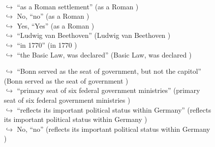 \documentclass[11pt,a4paper, onecolumn]{article}
\begin{document}
\begin{figure}[t]
\begin{tcolorbox}[boxsep=0pt,left=5pt,right=0pt,top=2pt,colback = yellow!5]
\begin{dialogue}
\\
\colorbox{pink!25}{$\hookrightarrow$}
{ ``as a Roman settlement'' (as a Roman ) }
\\
\colorbox{pink!25}{$\hookrightarrow$}
\colorbox{red!25}{No,}
{ ``no'' (as a Roman ) }
\\
\colorbox{pink!25}{$\hookrightarrow$}
\colorbox{red!25}{Yes,}
{ ``Yes'' (as a Roman ) }
\\
\colorbox{pink!25}{$\hookrightarrow$}
{ ``Ludwig van Beethoven'' (Ludwig van Beethoven ) }
\\
\colorbox{pink!25}{$\hookrightarrow$}
{ ``in 1770'' (in 1770 ) }
\\
\colorbox{pink!25}{$\hookrightarrow$}
{ ``the Basic Law, was declared'' (Basic Law, was declared ) }
 \end{dialogue}\end{tcolorbox}\end{figure}\begin{figure}[t] \small \begin{tcolorbox}[boxsep=0pt,left=5pt,right=0pt,top=2pt,colback = yellow!5] \begin{dialogue}
 \small 
\colorbox{pink!25}{$\hookrightarrow$}
{ ``Bonn served as the seat of government, but not the capitol'' (Bonn served as the seat of government ) }
\\
\colorbox{pink!25}{$\hookrightarrow$}
{ ``primary seat of six federal government ministries'' (primary seat of six federal government ministries ) }
\\
\colorbox{pink!25}{$\hookrightarrow$}
{ ``reflects its important political status within Germany'' (reflects its important political status within Germany ) }
\\
\colorbox{pink!25}{$\hookrightarrow$}
\colorbox{red!25}{No,}
{ ``no'' (reflects its important political status within Germany ) }
\\
 \end{dialogue}\end{tcolorbox}\end{figure}
\end{document}

